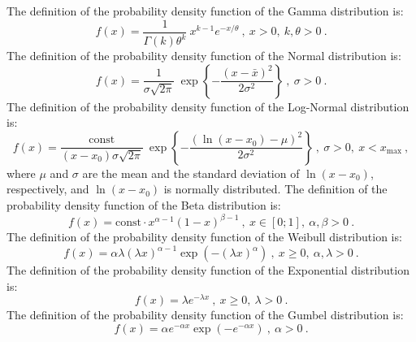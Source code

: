\documentclass[12pt,a4paper,final,twoside]{stylevk}
\begin{document}
The definition of the probability density function of the Gamma
distribution is:
%
\begin{equation}\label{Eq_GammaDist}
 f(x) =  \frac{1}{\Gamma(k)\theta^k} ~ x^{k-1}
 e^{-x/\theta} ~,~ x > 0 ,~ k,\theta > 0 ~.
\end{equation}
%
The definition of the probability density function of the Normal
distribution is:
%
\begin{equation}\label{Eq_NormalDist}
 f(x) = \frac{1}{ \sigma \sqrt{2\pi}} ~ \exp \left\{ -
 \frac{(x-\bar{x})^2}{2 \sigma^2} \right\}   ~,~ \sigma > 0 ~.
\end{equation}
%
The definition of the probability density function of the Log-Normal
distribution is:
%
\begin{equation}\label{Eq_LogNormalDist}
 f(x) = \frac{\mathrm{const}}{(x-x_0) \sigma \sqrt{2\pi}} ~ \exp \left\{ -
 \frac{(\ln(x-x_0)-\mu)^2}{2\sigma^2}  \right\}   ~,~ \sigma > 0,~ x <
 x_\mathrm{max} ~, 
\end{equation}
where $\mu$ and $\sigma$ are the mean and the standard deviation of
$\ln(x-x_0)$, respectively, and $\ln(x-x_0)$ is normally distributed.
%
%
The definition of the probability density function of the Beta
distribution is:
%
\begin{equation}\label{Eq_BetaDist}
 f(x) = \mathrm{const} \cdot x^{\alpha-1} (1-x)^{\beta-1}  ~,~  x \in
 [0;1] ,~ \alpha,\beta > 0  ~.
\end{equation}
%
The definition of the probability density function of the Weibull 
distribution is:
%
\begin{equation}\label{Eq_WeibullDist}
 f(x) = \alpha\lambda(\lambda x)^{\alpha-1} \exp(-(\lambda x)^\alpha) ~,~ x
 \geq 0 ,~ \alpha,\lambda > 0 ~.
\end{equation}
%
The definition of the probability density function of the Exponential
distribution is:
%
\begin{equation}\label{Eq_ExpDist}
 f(x) =  \lambda e^{-\lambda x} ~,~ x\geq 0 ,~ \lambda > 0 ~.
\end{equation}
%
The definition of the probability density function of the Gumbel
distribution is:
%
\begin{equation}\label{Eq_GumbelDist}
 f(x) =  \alpha e^{-\alpha x} \exp( -e^{-\alpha x} ) ~,~ \alpha > 0
 ~. 
\end{equation}
%
\end{document}
